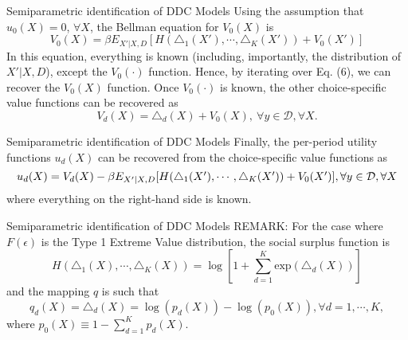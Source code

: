 \documentclass[xcolor=pdftex,dvipsnames,table,mathserif]{beamer}
\begin{document}
\begin{frame}{Semiparametric identification of DDC Models}
Using the assumption that $u_0(X) = 0$, $\forall X$, the Bellman equation for $V_0(X)$ is 
\begin{equation}
V_0(X) = \beta E_{X'|X,D} [ H (\triangle_1(X'), \cdots , \triangle_K(X')) + V_0(X')]
\end{equation}
In this equation, everything is known (including, importantly, the distribution of $X'|X, D$), except the $V_0(\cdot)$ function. Hence, by iterating over Eq. (6), we can recover the $V_0(X)$ function. Once $V_0(\cdot)$ is known, the other choice-specific value functions can be recovered as 
\begin{equation*}
V_d(X) = \triangle_d(X) + V_0(X), ~ \forall y \in \mathcal{D}, \forall X.
\end{equation*}
\end{frame}

\begin{frame}{Semiparametric identification of DDC Models}
Finally, the per-period utility functions $u_d(X)$ can be recovered from the choice-specific value functions as 
\begin{equation*}
\resizebox{.99 \hsize}{!}{$ u_d(X) = V_d(X) - \beta E_{X'|X,D} [ H (\triangle_1 (X'), \cdots , \triangle_K(X')) + V_0(X') ], \forall y \in \mathcal{D}, \forall X $}
\end{equation*}
where everything on the right-hand side is known. 
\end{frame}


\begin{frame}{Semiparametric identification of DDC Models}
REMARK: For the case where $F (\epsilon)$ is the Type 1 Extreme Value distribution, the social surplus function is 
\begin{equation*}
H(\triangle_1(X), \cdots , \triangle_K (X)) = \log \left [ 1 + \sum^K_{d=1} \text{exp} (\triangle_d(X)) \right ]
\end{equation*}
and the mapping $q$ is such that
\begin{equation*}
q_d(X) = \triangle_d(X) = \log (p_d(X)) - \log(p_0(X)), \forall d = 1, \cdots , K ,
\end{equation*}
where $p_0(X) \equiv 1 - \sum^K_{d=1} p_d(X).$
\end{frame}
\end{document}
